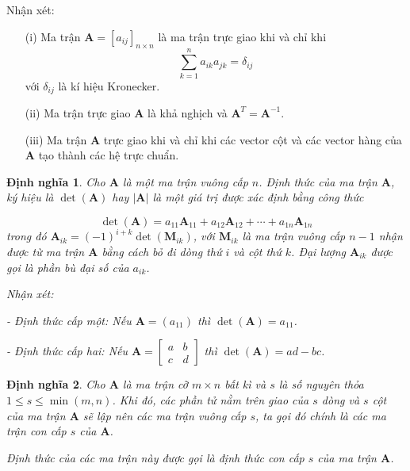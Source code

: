 \documentclass[14pt,oneside,a4paper]{report}
\newtheorem{dn}{Định nghĩa}[section]
\numberwithin{equation}{section}
\begin{document}
Nhận xét:
\begin{itemize}
	
	\item[(i)] Ma trận $\mathbf{A}=\left[a_{i j}\right]_{n \times n}$ là ma trận trực giao khi và chỉ khi $$\sum_{k=1}^{n} a_{i k} a_{j k}=\delta_{i j}$$ với $\delta_{i j}$ là kí hiệu Kronecker. 
	
	\item[(ii)] Ma trận trực giao $\mathbf{A}$ là khả nghịch và $\mathbf{A}^{T}=\mathbf{A}^{-1}$.
	
	\item[(iii)]  Ma trận $\mathbf{A}$ trực giao khi và chỉ khi các vector cột và các vector hàng của $\mathbf{A}$ tạo thành các hệ trực chuẩn.
\end{itemize}
\begin{dn}\rm 
	Cho $\mathbf{A}$ là một ma trận vuông cấp $n$. Định thức của ma trận $\mathbf{A}$, ký hiệu là $\operatorname{det}(\mathbf{A})$ hay $|\mathbf{A}|$ là một giá trị được xác định bằng công thức
	
	$$
	\operatorname{det}(\mathbf{A})=a_{11} \mathbf{A}_{11}+a_{12} \mathbf{A}_{12}+\cdots+a_{1 n} \mathbf{A}_{1 n}
	$$
	trong đó $\mathbf{A}_{i k}=(-1)^{i+k} \operatorname{det}\left(\mathbf{M}_{i k}\right)$, với $\mathbf{M}_{i k}$ là ma trận vuông cấp $n-1$ nhận được từ ma trận $\mathbf{A}$ bằng cách bỏ đi dòng thứ $i$ và cột thứ $k$. Đại lượng $\mathbf{A}_{i k}$ được gọi là phần bù đại số của $a_{i k}$.
	
	Nhận xét:
	
	- Định thức cấp một: Nếu $\mathbf{A}=\left(a_{11}\right)$ thì $\operatorname{det}(\mathbf{A})=a_{11}$.
	
	- Định thức cấp hai: Nếu $\mathbf{A}=\left[\begin{array}{ll}a & b \\ c & d\end{array}\right]$ thì $\operatorname{det}(\mathbf{A})=a d-b c$.
\end{dn}
\begin{dn}\rm 
	Cho $\mathbf{A}$ là ma trận cỡ $m \times n$ bất kì và $s$ là số nguyên thỏa $1 \leqslant s \leqslant \min (m, n)$. Khi đó, các phần tử nằm trên giao của $s$ dòng và $s$ cột của ma trận $\mathbf{A}$ sẽ lập nên các ma trận vuông cấp $s$, ta gọi đó chính là các ma trận con cấp $s$ của $\mathbf{A}$.
	
	Định thức của các ma trận này được gọi là định thức con cấp $s$ của ma trận $\mathbf{A}$.
\end{dn}
\end{document}
